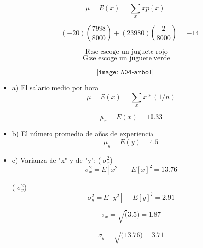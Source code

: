 \documentclass{../oxmathproblems}
\begin{document}
\begin{questions}

$$ \mu = E(x)= \sum_x xp(x)$$
 
   $$  = (-20)(\frac{7998}{8000}) + (23 980)(\frac{2}{8000}) = -14 $$ 

\question  
{}
$$ \text { R:se escoge un juguete rojo} $$ 
$$ \text { G:se escoge un juguete verde} $$ 

$$\texttt{[image: A04-arbol]}$$

\question  

\begin{itemize}
\item  a) El salario medio por hora 
$$ \mu = E(x)= \sum_x x *(1/n)$$

$$ \mu_x = E(x)= 10.33$$

\item  b) El número promedio de años de experiencia 
$$ \mu_y = E(y)= 4.5$$

\item  c) Varianza de "x" y de "y": 
  ( $\sigma^2_x$) 
  $$ \sigma^2_x = E[x^2]-E[x]^2 = 13.76 $$
  
  ( $\sigma^2_y$) 
  $$ \sigma^2_y = E[y^2]-E[y]^2 = 2.91 $$


$$ \sigma_x = \sqrt(3.5) = 1.87$$ 

$$ \sigma_y = \sqrt(13.76) = 3.71$$   
\end{itemize}



\end{questions} 
\end{document}
